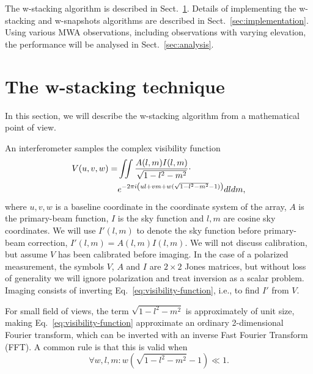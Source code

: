 \documentclass[useAMS,usenatbib]{mn2e}
\begin{document}
The w-stacking algorithm is described in Sect.~\ref{sec:wstacking}. Details of implementing the w-stacking and w-snapshots algorithms are described in Sect.~\ref{sec:implementation}. Using various MWA observations, including observations with varying elevation, the performance will be analysed in Sect.~\ref{sec:analysis}.

\section{The w-stacking technique} \label{sec:wstacking}
In this section, we will describe the w-stacking algorithm from a mathematical point of view.

An interferometer samples the complex visibility function
\begin{align}\notag
V(u,v,w) = & \iint \frac{A(l,m) I(l,m)}{\sqrt{1-l^2-m^2}} \cdot \\ \label{eq:visibility-function}
& e^{-2\pi i \left(ul + vm + w(\sqrt{1-l^2-m^2}-1)\right)} dl dm,
\end{align}
where $u,v,w$ is a baseline coordinate in the coordinate system of the array, $A$ is the primary-beam function, $I$ is the sky function and $l,m$ are cosine sky coordinates. We will use $I'(l,m)$ to denote the sky function before primary-beam correction, $I'(l,m)=A(l,m)I(l,m)$. We will not discuss calibration, but assume $V$ has been calibrated before imaging. In the case of a polarized measurement, the symbols $V$, $A$ and $I$ are $2\times 2$ Jones matrices, but without loss of generality we will ignore polarization and treat inversion as a scalar problem. Imaging consists of inverting Eq.~\eqref{eq:visibility-function}, i.e., to find $I'$ from $V$.

For small field of views, the term $\sqrt{1-l^2-m^2}$ is approximately of unit size, making Eq.~\eqref{eq:visibility-function} approximate an ordinary 2-dimensional Fourier transform, which can be inverted with an inverse Fast Fourier Transform (FFT). A common rule is that this is valid when
\begin{equation}\label{eq:when-2d-is-valid}
\forall w,l,m: w\left(\sqrt{1-l^2-m^2}-1\right) \ll 1.
\end{equation}
\end{document}
